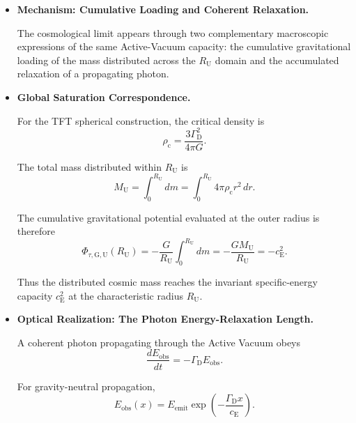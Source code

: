 \begin{itemize}

    \item \textbf{Mechanism: Cumulative Loading and Coherent Relaxation.}

    The cosmological limit appears through two complementary macroscopic expressions of the same Active-Vacuum capacity: the cumulative gravitational loading of the mass distributed across the $R_{\mathrm U}$ domain and the accumulated relaxation of a propagating photon.

    \item \textbf{Global Saturation Correspondence.}

    For the TFT spherical construction, the critical density is
    \begin{equation}
        \rho_{\mathrm c}
        =
        \frac{3\Gamma_{\mathrm D}^{2}}{4\pi G}.
    \end{equation}

    The total mass distributed within $R_{\mathrm U}$ is
    \begin{equation}
        M_{\mathrm U}
        =
        \int_{0}^{R_{\mathrm U}} dm
        =
        \int_{0}^{R_{\mathrm U}}
        4\pi\rho_{\mathrm c}r^{2}\,dr.
    \end{equation}

    The cumulative gravitational potential evaluated at the outer radius is therefore
    \begin{equation}
        \Phi_{\tau,\mathrm{G,U}}(R_{\mathrm U})
        =
        -\frac{G}{R_{\mathrm U}}
        \int_{0}^{R_{\mathrm U}} dm
        =
        -\frac{G M_{\mathrm U}}{R_{\mathrm U}}
        =
        -c_{\mathrm E}^{2}.
    \end{equation}

    Thus the distributed cosmic mass reaches the invariant specific-energy capacity $c_{\mathrm E}^{2}$ at the characteristic radius $R_{\mathrm U}$.

    \item \textbf{Optical Realization: The Photon Energy-Relaxation Length.}

    A coherent photon propagating through the Active Vacuum obeys
    \begin{equation}
        \frac{dE_{\mathrm{obs}}}{dt}
        =
        -\Gamma_{\mathrm D}E_{\mathrm{obs}}.
    \end{equation}

    For gravity-neutral propagation,
    \begin{equation}
        E_{\mathrm{obs}}(x)
        =
        E_{\mathrm{emit}}
        \exp\left(
            -\frac{\Gamma_{\mathrm D}x}{c_{\mathrm E}}
        \right).
    \end{equation}


\end{itemize}
